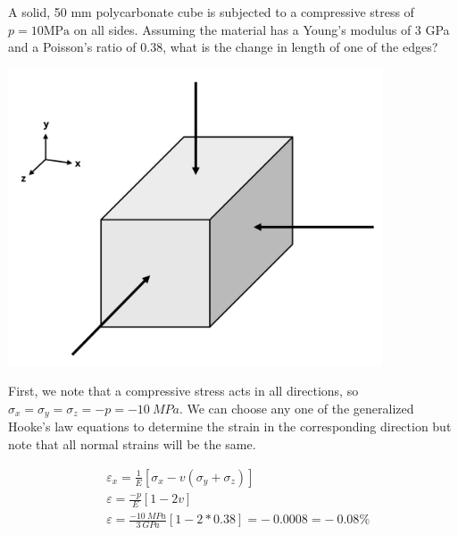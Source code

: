 \documentclass[
  letterpaper,
  DIV=11,
  numbers=noendperiod]{scrreprt}
\begin{document}
\begin{tcolorbox}[enhanced jigsaw, breakable, opacityback=0, toptitle=1mm, left=2mm, colback=white, opacitybacktitle=0.6, colframe=quarto-callout-tip-color-frame, titlerule=0mm, arc=.35mm, leftrule=.75mm, bottomtitle=1mm, colbacktitle=quarto-callout-tip-color!10!white, rightrule=.15mm, title={Example 4.5}, bottomrule=.15mm, toprule=.15mm, coltitle=black]

A solid, 50 mm polycarbonate cube is subjected to a compressive stress
of \(p=10 \mathrm{MPa}\) on all sides. Assuming the material has a
Young's modulus of 3 GPa and a Poisson's ratio of 0.38, what is the
change in length of one of the edges?

\begin{center}
\includegraphics[width=4.36458in,height=\textheight]{images/CH4 PNGs/example 4.5.png}
\end{center}

\begin{tcolorbox}[enhanced jigsaw, breakable, opacityback=0, toptitle=1mm, left=2mm, colback=white, opacitybacktitle=0.6, colframe=quarto-callout-tip-color-frame, titlerule=0mm, arc=.35mm, leftrule=.75mm, bottomtitle=1mm, colbacktitle=quarto-callout-tip-color!10!white, rightrule=.15mm, title={Solution}, bottomrule=.15mm, toprule=.15mm, coltitle=black]

First, we note that a compressive stress acts in all directions, so
\(\sigma_x=\sigma_y=\sigma_z=-p=-10{~MPa}\). We can choose any one of
the generalized Hooke's law equations to determine the strain in the
corresponding direction but note that all normal strains will be the
same.

\[
\begin{aligned}
& \varepsilon_x=\frac{1}{E}\left[\sigma_x-v\left(\sigma_y+\sigma_z\right)\right] \\
& \varepsilon=\frac{-p}{E}[1-2 v] \\
& \varepsilon=\frac{-10 {~MPa}}{3{~GPa}}[1-2*0.38]=-~0.0008=-~0.08 \%
\end{aligned}
\]


\end{tcolorbox}
\end{tcolorbox}
\end{document}
